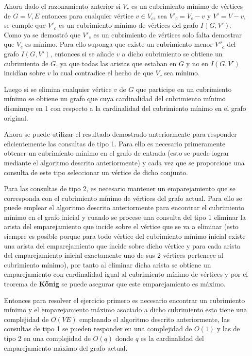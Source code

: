 \documentclass{article}
\begin{document}
Ahora dado el razonamiento anterior si $V_c$ es un cubrimiento mínimo de vértices de $G = V, E$ entonces para cualquier vértice $v \in V_c$, sea $V'_c=V_c - v$
y $V'= V-v$, se cumple que $V'_c$ es un cubrimiento mínimo de vértices del grafo $I(G,V')$. Como ya se demostró que $V'_c$ es un cubrimiento de vértices
solo falta demostrar que $V_c$ es mínimo. Para ello suponga que existe un cubrimiento menor $V''_c$ del grafo $I(G,V')$, entonces si se añade $v$ a dicho
cubrimiento se obtiene un cubrimiento de $G$, ya que todas las aristas que estaban en $G$ y no en $I(G,V')$ incidían sobre
$v$ lo cual contradice el hecho de que $V_c$ sea mínimo.

Luego si se elimina cualquier vértice $v$ de $G$ que participe en un cubrimiento mínimo se obtiene un grafo que cuya cardinalidad del cubrimiento mínimo disminuye en 1
con respecto a la cardinalidad del cubrimiento mínimo en el grafo original.

Ahora se puede utilizar el resultado demostrado anteriormente para responder eficientemente las consultas de tipo 1. Para ello es necesario
primeramente obtener un cubrimiento mínimo en el grafo de entrada (esto se puede lograr mediante el algoritmo descrito anteriormente)
y cada vez que se proporcione una consulta de este tipo seleccionar un vértice de dicho conjunto.

Para las consultas de tipo 2, es necesario mantener un emparejamiento que se corresponda con el cubrimiento mínimo de vértices del grafo actual.
Para ello se puede emplear el algoritmo descrito anteriormente para encontrar el cubrimiento mínimo en el grafo inicial
y cuando se procese una consulta del tipo 1 eliminar la arista del emparejamiento que incide sobre el vértice que se va a eliminar (esto siempre
es posible porque para todo vértice del cubrimiento mínimo inicial existe una arista del emparejamiento que incide sobre dicho vértice
y para cada arista del emparejamiento inicial exactamente uno de sus 2 vértices pertenece al cubrimiento mínimo), por tanto al eliminar dicha arista
se obtiene un emparejamiento con cardinalidad igual al cubrimiento mínimo de vértices y por el teorema de \textbf{Kőnig} se puede asegurar
que este emparejamiento es máximo.

Entonces para resolver el ejercicio primero es necesario encontrar un cubrimiento mínimo y el emparejamiento máximo asociado a dicho cubrimiento
esto tiene una complejidad de $O(VE)$ empleando el algoritmo descrito anteriormente, las consultas de tipo 1 se pueden responder en una
complejidad de $O(1)$ y las de tipo 2 en una complejidad de $O(q)$ donde $q$ es la cardinalidad del emparejamiento máximo del grafo actual.
\end{document}
